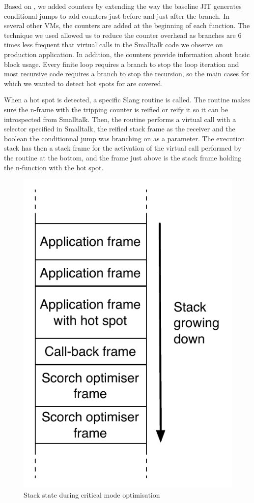 \documentclass[a4paper,12pt,twoside]{../includes/ThesisStyle}
\begin{document}

Based on \cite{Arn02}, we added counters by extending the way the baseline JIT generates conditional jumps to add counters just before and just after the branch. In several other VMs, the counters are added at the beginning of each function. The technique we used allowed us to reduce the counter overhead as branches are 6 times less frequent that virtual calls in the Smalltalk code we observe on production application. In addition, the counters provide information about basic block usage. Every finite loop requires a branch to stop the loop iteration and most recursive code requires a branch to stop the recursion, so the main cases for which we wanted to detect hot spots for are covered.

When a hot spot is detected, a specific Slang routine is called. The routine makes sure the n-frame with the tripping counter is reified or reify it so it can be introspected from Smalltalk. Then, the routine performs a virtual call with a selector specified in Smalltalk, the reified stack frame as the receiver and the boolean the conditionnal jump was branching on as a parameter. The execution stack has then a stack frame for the activation of the virtual call performed by the routine at the bottom, and the frame just above is the stack frame holding the n-function with the hot spot.

\begin{figure}[h!]
    \begin{center}
        \includegraphics[width=0.35\linewidth]{HotSpotCallBackStack}
        \caption{Stack state during critical mode optimisation}
        \label{fig:HotSpotCallBackStack}
    \end{center}
\end{figure}
\end{document}
